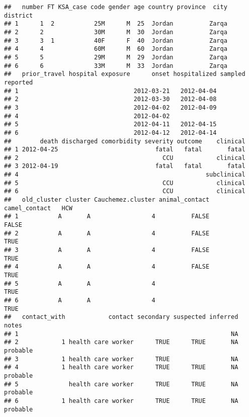 \documentclass[]{article}
\begin{document}
\begin{verbatim}
##   number FT KSA_case code gender age country province  city district
## 1      1  2           25M      M  25  Jordan          Zarqa         
## 2      2              30M      M  30  Jordan          Zarqa         
## 3      3  1           40F      F  40  Jordan          Zarqa         
## 4      4              60M      M  60  Jordan          Zarqa         
## 5      5              29M      M  29  Jordan          Zarqa         
## 6      6              33M      M  33  Jordan          Zarqa         
##   prior_travel hospital exposure      onset hospitalized sampled reported
## 1                                2012-03-21   2012-04-04                 
## 2                                2012-03-30   2012-04-08                 
## 3                                2012-04-02   2012-04-09                 
## 4                                2012-04-02                              
## 5                                2012-04-11   2012-04-15                 
## 6                                2012-04-12   2012-04-14                 
##        death discharged comorbidity severity outcome    clinical
## 1 2012-04-25                           fatal   fatal       fatal
## 2                                        CCU            clinical
## 3 2012-04-19                           fatal   fatal       fatal
## 4                                                    subclinical
## 5                                        CCU            clinical
## 6                                        CCU            clinical
##   old_cluster cluster Cauchemez.cluster animal_contact camel_contact   HCW
## 1           A       A                 4          FALSE               FALSE
## 2           A       A                 4          FALSE                TRUE
## 3           A       A                 4          FALSE                TRUE
## 4           A       A                 4          FALSE                TRUE
## 5           A       A                 4                               TRUE
## 6           A       A                 4                               TRUE
##   contact_with            contact secondary suspected inferred    notes
## 1                                                           NA         
## 2            1 health care worker      TRUE      TRUE       NA probable
## 3            1 health care worker      TRUE                 NA         
## 4            1 health care worker      TRUE      TRUE       NA probable
## 5              health care worker      TRUE      TRUE       NA probable
## 6            1 health care worker      TRUE      TRUE       NA probable

\end{verbatim}
\end{document}
